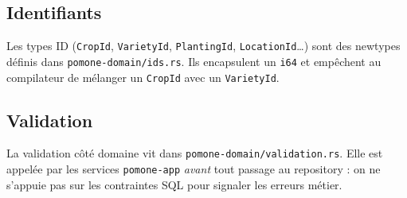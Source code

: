 \subsection{Identifiants}

Les types ID (\texttt{CropId}, \texttt{VarietyId}, \texttt{PlantingId}, \texttt{LocationId}\dots) sont des newtypes définis dans \texttt{pomone-domain/ids.rs}. Ils encapsulent un \texttt{i64} et empêchent au compilateur de mélanger un \texttt{CropId} avec un \texttt{VarietyId}.

\subsection{Validation}

La validation côté domaine vit dans \texttt{pomone-domain/validation.rs}. Elle est appelée par les services \texttt{pomone-app} \emph{avant} tout passage au repository : on ne s'appuie pas sur les contraintes SQL pour signaler les erreurs métier.
